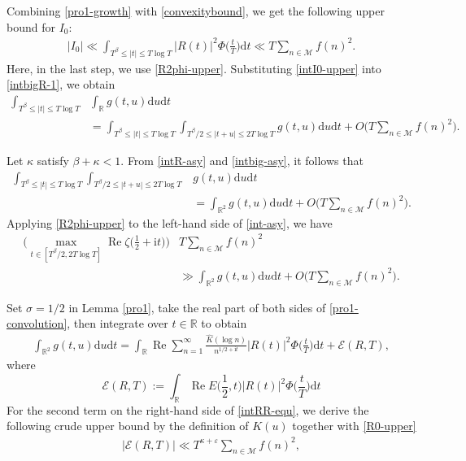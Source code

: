 \documentclass[12pt,reqno]{amsart}
\theoremstyle{definition}
\numberwithin{equation}{section}
\newcommand{\Bgl}{\Big(}
\newcommand{\Bgr}{\Big)}
\newcommand{\ph}{\Phi}
\newcommand{\mbr}{\mathbb{R}}
\newcommand{\mce}{\mathcal{E}}
\newcommand{\mcm}{\mathcal{M}}
\newcommand{\mmd}{\mathrm{d}}
\newcommand{\mit}{\mathrm{i}t}
\newcommand{\re}{\operatorname{Re}}
\begin{document}
Combining \eqref{pro1-growth} with \eqref{convexitybound}, we get the following upper bound for \(I_0\):
\begin{align}
\label{intI0-upper}
    |I_0| \ll \int_{T^\beta \le |t| \le T\log T}|R(t)|^2 \ph \Bgl\frac{t}{T}\Bgr \mmd t \ll T \sum_{n \in \mcm}f(n)^2.
\end{align}
Here, in the last step, we use \eqref{R2phi-upper}. Substituting \eqref{intI0-upper} into \eqref{intbigR-1}, we obtain
\begin{align}
    \label{intbig-asy}
    \int_{T^\beta \le |t| \le T\log T}& \int_\mbr g(t,u)\mmd u \mmd t \nonumber \\ &=\int_{T^\beta \le |t| \le T\log T} \int_{T^\beta/2 \le |t+u| \le 2T\log T} g(t,u)\mmd u \mmd t + O\Bgl T \sum_{n \in \mcm}f(n)^2 \Bgr.
\end{align}
\par
Let \(\kappa\) satisfy \(\beta+\kappa<1\). From \eqref{intR-asy} and \eqref{intbig-asy}, it follows that
\begin{align}
\label{int-asy}
    \int_{T^\beta \le |t| \le T\log T} \int_{T^\beta/2 \le |t+u| \le 2T\log T}& g(t,u)\mmd u \mmd t \nonumber \\
    &= \int_{\mbr^2}  g(t,u)\mmd u \mmd t + O\Bgl T \sum_{n \in \mcm}f(n)^2 \Bgr.
\end{align}
Applying \eqref{R2phi-upper} to the left-hand side of \eqref{int-asy}, we have 
\begin{align}
\label{max-gg}
    \Bgl\max_{t \in [T^\beta/2,2T\log T]} \re \zeta\Bgl\frac{1}{2}+\mit\Bgr \Bgr&  T  \sum_{n \in \mcm}f(n)^2 \nonumber \\
    & \gg \int_{\mbr^2}  g(t,u)\mmd u \mmd t + O\Bgl T \sum_{n \in \mcm}f(n)^2 \Bgr.
\end{align}
\par
Set \(\sigma = 1/2\) in Lemma \ref{pro1}, take the real part of both sides of \eqref{pro1-convolution}, then integrate over \(t \in \mbr\) to obtain
\begin{align}
\label{intRR-equ}
    \int_{\mbr^2}   g(t,u)\mmd u \mmd t 
    = \int_\mbr \re \sum_{n=1}^\infty \frac{\widehat{K}(\log n)}{n^{1/2+\mit}} |R(t)|^2 \ph \Bgl\frac{t}{T}\Bgr  \mmd t + \mce(R,T),
\end{align}
where
\[
\mce(R,T) := \int_\mbr \re E\Bgl \frac{1}{2}, t \Bgr |R(t)|^2 \ph \Bgl\frac{t}{T}\Bgr  \mmd t
\]
For the second term on the right-hand side of \eqref{intRR-equ}, we derive the following crude upper bound by the definition of \(K(u)\) together with \eqref{R0-upper}
\begin{align}
    \label{E-upper}
    |\mce(R,T)|\ll T^{\kappa+\varepsilon} \sum_{n \in \mcm}f(n)^2,
\end{align}
\end{document}

